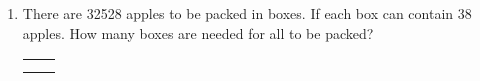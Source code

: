 \begin{enumerate}
    \item There are 32528 apples to be packed in boxes. If each box can contain 38 apples. How many boxes are needed for all
            to be packed?

    \begin{myTableStyle} \begin{tabular}{ |m{10cm}|m{3cm}| } \hline
        &  \\\hline
        &  \\\hline
        \multicolumn{2}{|c|}{} \\\hline
    \end{tabular} \end{myTableStyle} \vspace{0.08in}

\end{enumerate}
